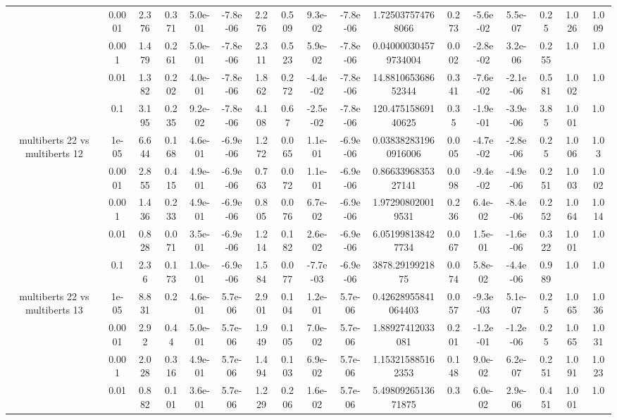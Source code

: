 \begin{tabular}{|c|c|c|c|c|c|c|c|c|c|c|c|c|c|c|c|c|}
 & 0.0001 & 2.376 & 0.371 & 5.0e-01 & -7.8e-06 & 2.276 & 0.509 & 9.3e-02 & -7.8e-06 & 1.725037574768066 & 0.273 & -5.6e-02 & 5.5e-07 & 0.25 & 1.026 & 1.009 \\
 & 0.001 & 1.479 & 0.261 & 5.0e-01 & -7.8e-06 & 2.311 & 0.523 & 5.9e-02 & -7.8e-06 & 0.040000304579734004 & 0.002 & -2.8e-02 & 3.2e-06 & 0.255 & 1.0 & 1.0 \\
 & 0.01 & 1.382 & 0.202 & 4.0e-01 & -7.8e-06 & 1.862 & 0.272 & -4.4e-02 & -7.8e-06 & 14.881065368652344 & 0.341 & -7.6e-02 & -2.1e-06 & 0.581 & 1.002 & 1.0 \\
 & 0.1 & 3.195 & 0.235 & 9.2e-02 & -7.8e-06 & 4.108 & 0.67 & -2.5e-02 & -7.8e-06 & 120.47515869140625 & 0.35 & -1.9e-01 & -3.9e-06 & 3.85 & 1.001 & 1.0 \\
\hline
\multirow{5}{*}{multiberts 22 vs multiberts 12} & 1e-05 & 6.644 & 0.168 & 4.6e-01 & -6.9e-06 & 1.272 & 0.065 & 1.1e-01 & -6.9e-06 & 0.038382831960916006 & 0.005 & -4.7e-02 & -2.8e-06 & 0.25 & 1.006 & 1.03 \\
 & 0.0001 & 2.855 & 0.415 & 4.9e-01 & -6.9e-06 & 0.763 & 0.072 & 1.1e-01 & -6.9e-06 & 0.8663396835327141 & 0.098 & -9.4e-02 & -4.9e-06 & 0.251 & 1.003 & 1.002 \\
 & 0.001 & 1.436 & 0.233 & 4.9e-01 & -6.9e-06 & 0.805 & 0.076 & 6.7e-02 & -6.9e-06 & 1.972908020019531 & 0.236 & 6.4e-02 & -8.4e-06 & 0.252 & 1.064 & 1.014 \\
 & 0.01 & 0.828 & 0.071 & 3.5e-01 & -6.9e-06 & 1.214 & 0.182 & 2.6e-02 & -6.9e-06 & 6.051998138427734 & 0.067 & 1.5e-01 & -1.6e-06 & 0.322 & 1.001 & 1.0 \\
 & 0.1 & 2.36 & 0.173 & 1.0e-01 & -6.9e-06 & 1.584 & 0.077 & -7.7e-03 & -6.9e-06 & 3878.2919921875 & 0.074 & 5.8e-02 & -4.4e-06 & 0.989 & 1.0 & 1.0 \\
\hline
\multirow{5}{*}{multiberts 22 vs multiberts 13} & 1e-05 & 8.831 & 0.2 & 4.6e-01 & 5.7e-06 & 2.901 & 0.104 & 1.2e-01 & 5.7e-06 & 0.42628955841064403 & 0.057 & -9.3e-03 & 5.1e-07 & 0.25 & 1.065 & 1.036 \\
 & 0.0001 & 2.92 & 0.44 & 5.0e-01 & 5.7e-06 & 1.949 & 0.105 & 7.0e-02 & 5.7e-06 & 1.88927412033081 & 0.201 & -1.2e-01 & -1.2e-06 & 0.25 & 1.065 & 1.031 \\
 & 0.001 & 2.028 & 0.316 & 4.9e-01 & 5.7e-06 & 1.494 & 0.103 & 6.9e-02 & 5.7e-06 & 1.153215885162353 & 0.148 & 9.0e-02 & 6.2e-07 & 0.251 & 1.091 & 1.023 \\
 & 0.01 & 0.882 & 0.101 & 3.6e-01 & 5.7e-06 & 1.229 & 0.206 & 1.6e-02 & 5.7e-06 & 5.4980926513671875 & 0.3 & 6.0e-02 & 2.9e-06 & 0.451 & 1.001 & 1.0 \\

\end{tabular}
